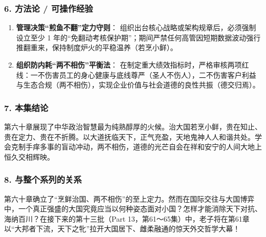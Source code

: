 \subsubsection{6. 方法论 / 可操作经验}
\begin{enumerate}
    \item \textbf{管理决策“煎鱼不翻”定力守则}：
    组织出台核心战略或架构规章后，必须强制设立至少 1 年的“免翻动考核保护期”；期间严禁任何高管因短期数据波动强行推翻重来，保持制度炉火的平稳温养（若烹小鲜）。
    \item \textbf{组织防内耗“两不相伤”平衡法}：
    在制定重大绩效指标时，严格审核两项红线：一不伤害员工的身心健康与底线尊严（圣人不伤人），二不伤害客户利益与生态合规（两不相伤），实现企业价值与社会道德的良性共振（德交归焉）。
\end{enumerate}

\subsubsection{7. 本集结论}
第六十章展现了中华政治智慧最为纯熟醇厚的火候。治大国若烹小鲜，贵在知止、贵在定力、贵在不折腾。以大道抚临天下，正气充盈，天地鬼神人人和谐共处。学会克制手痒多事的盲动冲动，两不相伤，道德的光芒自会在祥和安宁的人间大地上恒久交相辉映。

\subsubsection{8. 与整个系列的关系}
第六十章确立了“烹鲜治国、两不相伤”的至上定力。然而在国际交往与大国博弈中，一个真正强盛的大国究竟应当以何种姿态面对小国？怎样才能消除天下对抗、海纳百川？在接下来的第十三批（Part 13，第61～65集）中，老子将在第61章以“大邦者下流，天下之牝”拉开大国居下、雌柔融通的惊天外交哲学大幕！